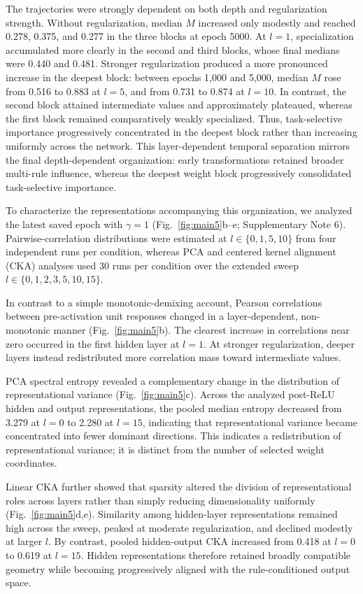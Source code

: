\documentclass{article}
\begin{document}
The trajectories were strongly dependent on both depth and regularization strength. Without regularization, median $M$ increased only modestly and reached 0.278, 0.375, and 0.277 in the three blocks at epoch 5000. At $l=1$, specialization accumulated more clearly in the second and third blocks, whose final medians were 0.440 and 0.481. Stronger regularization produced a more pronounced increase in the deepest block: between epochs 1,000 and 5,000, median $M$ rose from 0.516 to 0.883 at $l=5$, and from 0.731 to 0.874 at $l=10$. In contrast, the second block attained intermediate values and approximately plateaued, whereas the first block remained comparatively weakly specialized. Thus, task-selective importance progressively concentrated in the deepest block rather than increasing uniformly across the network. This layer-dependent temporal separation mirrors the final depth-dependent organization: early transformations retained broader multi-rule influence, whereas the deepest weight block progressively consolidated task-selective importance.

To characterize the representations accompanying this organization, we analyzed the latest saved epoch with \(\gamma = 1\) (Fig.~\ref{fig:main5}b--e; Supplementary Note 6). Pairwise-correlation distributions were estimated at \(l \in \{ 0,1,5,10\}\) from four independent runs per condition, whereas PCA and centered kernel alignment (CKA) analyses used 30 runs per condition over the extended sweep \(l \in \{ 0,1,2,3,5,10,15\}\).

In contrast to a simple monotonic-demixing account, Pearson correlations between pre-activation unit responses changed in a layer-dependent, non-monotonic manner (Fig.~\ref{fig:main5}b). The clearest increase in correlations near zero occurred in the first hidden layer at \(l = 1\). At stronger regularization, deeper layers instead redistributed more correlation mass toward intermediate values.



PCA spectral entropy revealed a complementary change in the distribution of representational variance (Fig.~\ref{fig:main5}c). Across the analyzed post-ReLU hidden and output representations, the pooled median entropy decreased from 3.279 at \(l = 0\) to 2.280 at \(l = 15\), indicating that representational variance became concentrated into fewer dominant directions. This indicates a redistribution of representational variance; it is distinct from the number of selected weight coordinates.

Linear CKA further showed that sparsity altered the division of representational roles across layers rather than simply reducing dimensionality uniformly (Fig.~\ref{fig:main5}d,e). Similarity among hidden-layer representations remained high across the sweep, peaked at moderate regularization, and declined modestly at larger $l$. By contrast, pooled hidden-output CKA increased from 0.418 at $l=0$ to 0.619 at $l=15$. Hidden representations therefore retained broadly compatible geometry while becoming progressively aligned with the rule-conditioned output space.
\end{document}
